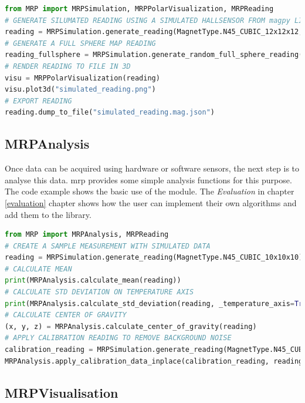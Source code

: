 \begin{lstlisting}[language=Python, caption={MRPSimulation example illustrates the usage of several functions how to generate simulated magnets}, label=lst:mrpexample_simulation]
from MRP import MRPSimulation, MRPPolarVisualization, MRPReading
# GENERATE SILUMATED READING USING A SIMULATED HALLSENSOR FROM magpy LIBRARY
reading = MRPSimulation.generate_reading(MagnetType.N45_CUBIC_12x12x12,_add_random_polarisation=True)
# GENERATE A FULL SPHERE MAP READING
reading_fullsphere = MRPSimulation.generate_random_full_sphere_reading()
# RENDER READING TO FILE IN 3D
visu = MRPPolarVisualization(reading)
visu.plot3d("simulated_reading.png")
# EXPORT READING
reading.dump_to_file("simulated_reading.mag.json")
\end{lstlisting}

\hypertarget{mrpanalysis}{%
\subsection{MRPAnalysis}\label{mrpanalysis}}

Once data can be acquired using hardware or software sensors, the next
step is to analyse this data. \gls{mrp} provides some simple analysis
functions for this purpose. The code example shows the basic use of the
module. The \emph{Evaluation} in chapter \ref{evaluation} chapter shows
how the user can implement their own algorithms and add them to the
library.

\begin{lstlisting}[language=Python, caption={MRPAnalysis example code performs several data analysis steps}, label=lst:mrpexample_analysis]
from MRP import MRPAnalysis, MRPReading
# CREATE A SAMPLE MEASUREMENT WITH SIMULATED DATA
reading = MRPSimulation.generate_reading(MagnetType.N45_CUBIC_10x10x10)
# CALCULATE MEAN
print(MRPAnalysis.calculate_mean(reading))
# CALCULATE STD DEVIATION ON TEMPERATURE AXIS
print(MRPAnalysis.calculate_std_deviation(reading, _temperature_axis=True))
# CALCULATE CENTER OF GRAVITY
(x, y, z) = MRPAnalysis.calculate_center_of_gravity(reading)
# APPLY CALIBRATION READING TO REMOVE BACKGROUND NOISE
calibration_reading = MRPSimulation.generate_reading(MagnetType.N45_CUBIC_10x10x10, _ideal = True)
MRPAnalysis.apply_calibration_data_inplace(calibration_reading, reading)
\end{lstlisting}

\hypertarget{mrpvisualisation}{%
\subsection{MRPVisualisation}\label{mrpvisualisation}}

